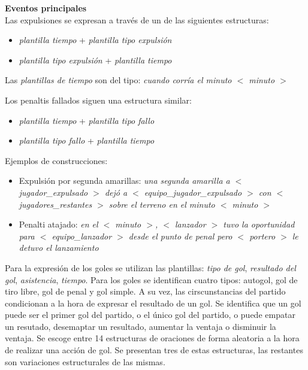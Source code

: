 \textbf{Eventos principales}\\


    Las expulsiones se expresan a través de un de las siguientes estructuras:
    \begin{itemize}
        \item \textit{plantilla tiempo} + \textit{plantilla tipo expulsión}
        \item \textit{plantilla tipo expulsión} + \textit{plantilla tiempo}
    \end{itemize}

    Las \textit{plantillas de tiempo} son del tipo: \textit{cuando corría el minuto $<$ minuto $>$}

    Los penaltis fallados siguen una estructura similar:
    \begin{itemize}
        \item \textit{plantilla tiempo} + \textit{plantilla tipo fallo}
        \item \textit{plantilla tipo fallo} + \textit{plantilla tiempo}
    \end{itemize}

    Ejemplos de construcciones: 

    \begin{itemize}
    \item Expulsión por segunda amarillas:  \textit{una segunda amarilla a $<$ jugador\_expulsado $>$ dejó 
    a $<$ equipo\_jugador\_expulsado $>$ con $<$ jugadores\_restantes $>$ sobre el terreno 
    en el minuto $<$ minuto $>$}
    
    \item Penalti atajado: \textit{en el $<$ minuto $>$, $<$ lanzador $>$ tuvo la oportunidad 
    para $<$ equipo\_lanzador $>$ desde el punto de penal pero $<$ portero $>$ le detuvo el lanzamiento}
    \end{itemize}


    Para la expresión de los goles se utilizan las plantillas: \textit{tipo de gol}, \textit{resultado del gol}, 
    \textit{asistencia}, \textit{tiempo}. Para los goles se identifican cuatro tipos: autogol, gol de tiro libre, 
    gol de penal y gol simple. A su vez, las cirscunstancias del partido condicionan a la hora de expresar el resultado 
    de un gol. Se identifica que un gol puede ser el primer gol del partido, o el único gol del partido, o puede empatar 
    un resutado, desemaptar un resultado, aumentar la ventaja o disminuir la ventaja.
    Se escoge entre 14 estructuras de oraciones de forma aleatoria a la hora de realizar una acción de gol. Se presentan tres 
    de estas estructuras, las restantes son variaciones estructurales de las mismas.
    
